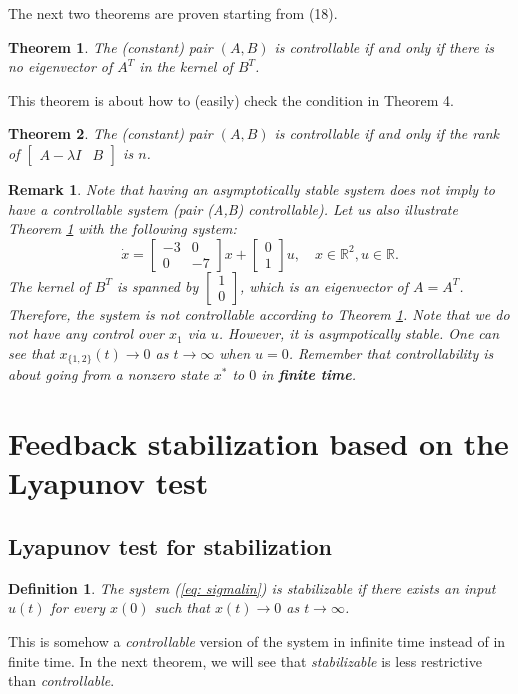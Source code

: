 \documentclass[11pt,a4paper,titlepage]{article}
\newtheorem{definition}{Definition}
\newtheorem{theorem}{Theorem}
\newtheorem{remark}{Remark}
\begin{document}
The next two theorems are proven starting from (18).
\begin{theorem}
	\label{thm: atbt}
	The (constant) pair $(A,B)$ is controllable if and only if there is no eigenvector of $A^T$ in the kernel of $B^T$.
\end{theorem}

This theorem is about how to (easily) check the condition in Theorem 4.
\begin{theorem}
	The (constant) pair $(A,B)$ is controllable if and only if the rank of $\begin{bmatrix}A-\lambda I & B\end{bmatrix}$ is $n$.
\end{theorem}

\begin{remark}
	Note that having an asymptotically stable system does not imply to have a controllable system (pair (A,B) controllable). Let us also illustrate Theorem \ref{thm: atbt} with the following system:
\begin{equation}
	\dot x = \begin{bmatrix}-3 & 0 \\ 0 & -7\end{bmatrix}x + \begin{bmatrix}0 \\ 1\end{bmatrix}u, \quad x\in\mathbb{R}^2, u\in\mathbb{R}.
\end{equation}
	The kernel of $B^T$ is spanned by $\begin{bmatrix}1 \\ 0\end{bmatrix}$, which is an eigenvector of $A = A^T$. Therefore, the system is not controllable according to Theorem \ref{thm: atbt}. Note that we do not have any control over $x_1$ via $u$. However, it is asympotically stable. One can see that $x_{\{1,2\}}(t) \to 0$ as $t\to\infty$ when $u = 0$. Remember that controllability is about going from a nonzero state $x^*$ to $0$ in \textbf{finite time}.
\end{remark}

\section{Feedback stabilization based on the Lyapunov test}
\subsection{Lyapunov test for stabilization}
\begin{definition}
The system (\ref{eq: sigmalin}) is stabilizable if there exists an input $u(t)$ for every $x(0)$ such that $x(t)\to 0$ as $t\to\infty$.
\end{definition}
This is somehow a \emph{controllable} version of the system in infinite time instead of in finite time. In the next theorem, we will see that \emph{stabilizable} is less restrictive than \emph{controllable}.
\end{document}
